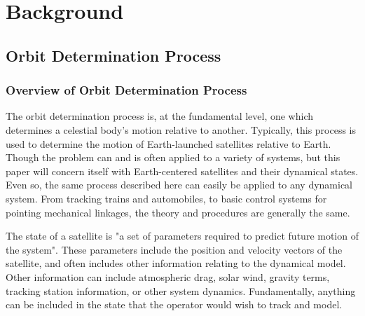 \documentclass[12pt,a4paper,oneside]{article}
\numberwithin{equation}{section}   		%
\begin{document}
\newpage
\tableofcontents{}
\listoffigures{}


\newpage
\section{Background}

\subsection{Orbit Determination Process}
\label{sec:OD Process}


\subsubsection{Overview of Orbit Determination Process}
\label{sec:OD sub Overview}
The orbit determination process is, at the fundamental level, one which determines a celestial body's motion relative to another. Typically, this process is used to determine the motion of Earth-launched satellites relative to Earth. Though the problem can and is often applied to a variety of systems, but this paper will concern itself with Earth-centered satellites and their dynamical states. Even so, the same process described here can easily be applied to any dynamical system. From tracking trains and automobiles, to basic control systems for pointing mechanical linkages, the theory and procedures are generally the same. 

The state of a satellite is "a set of parameters required to predict future motion of the system"\cite{tapley2004statistical}. These parameters include the position and velocity vectors of the satellite, and often includes other information relating to the dynamical model. Other information can include atmospheric drag, solar wind, gravity terms, tracking station information, or other system dynamics. Fundamentally, anything can be included in the state that the operator would wish to track and model. 
\end{document}
